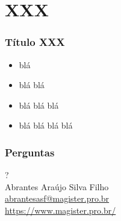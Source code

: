 \documentclass[pdftex, brazil]{beamer}
\begin{document}
\section{XXX}

\begin{frame}
	\frametitle{Título XXX}

	\begin{itemize}
		\item blá
		\item blá blá
		\item blá blá blá
		\item blá blá blá blá
	\end{itemize}

\end{frame}


\begin{frame}
\frametitle{Perguntas}
\begin{center}
  \Huge ?
  \vspace{1.6cm}
  \normalsize
  \\
  Abrantes Araújo Silva Filho
  \\
  \url{abrantesasf@magister.pro.br}
  \\
  \url{https://www.magister.pro.br/}
\end{center}
\end{frame}


\end{document}
